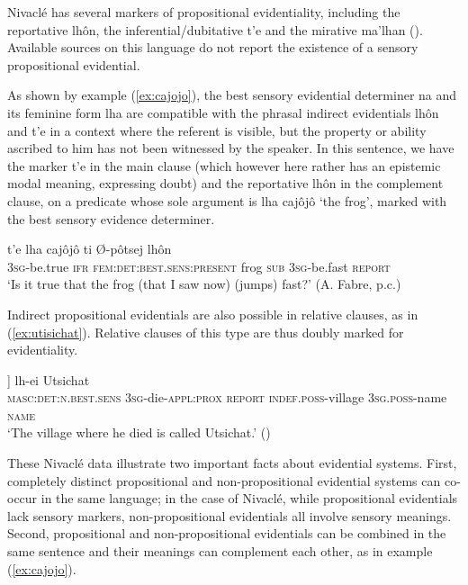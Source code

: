 \documentclass[oneside,a4paper,11pt]{article}
\newcommand{\ipa}[1]{{\phon \mbox{#1}}} %
\begin{document}
 Nivaclé has several markers of propositional evidentiality, including the reportative \ipa{lhôn}, the inferential/dubitative \ipa{t'e}  and the mirative \ipa{ma'lhan} (\citealt[256-257]{fabre14nivacle}). Available sources on this language do not report the existence of a sensory propositional evidential.

As shown by example (\ref{ex:cajojo}), the best sensory evidential determiner \ipa{na} and its feminine form \ipa{lha} are compatible with the phrasal indirect evidentials \ipa{lhôn} and \ipa{t'e} in a context where the referent is visible, but the property or ability ascribed to him has not been witnessed by the speaker. In this sentence, we have the marker \ipa{t'e} in the main clause (which however here rather has an epistemic modal meaning, expressing doubt) and the reportative \ipa{lhôn} in the complement clause, on a predicate whose sole argument is \ipa{lha} \ipa{cajôjô} `the frog', marked with the best sensory evidence determiner.

\begin{exe}
\ex \label{ex:cajojo}
\gll \ipa{y-ijô’} \ipa{t’e} \ipa{lha} \ipa{cajôjô} \ipa{ti} \ipa{Ø-pôtsej} \ipa{lhôn} \\
\textsc{3sg}-be.true \textsc{ifr} \textsc{fem:det:best.sens:present} frog \textsc{sub} \textsc{3sg}-be.fast \textsc{report} \\
\glt `Is it true that the frog (that I saw now) (jumps) fast?' (A. Fabre, p.c.)
\end{exe}

Indirect propositional evidentials are also possible in relative clauses, as in (\ref{ex:utisichat}).  Relative clauses of this type are thus doubly marked for evidentiality.

\begin{exe}
\ex \label{ex:utisichat}
\gll
[\ipa{pa} 	[\ipa{Ø-vaf-’e} 	\ipa{lhôn}] 	\ipa{yi-tsaat}] 	\ipa{lh-ei} 	\ipa{Utsichat} \\
\textsc{masc:det:n.best.sens} \textsc{3sg}-die-\textsc{appl:prox} \textsc{report} \textsc{indef.poss}-village \textsc{3sg.poss}-name \textsc{name} \\
\glt `The village where he died is called Utsichat.' (\citealt[157]{fabre14nivacle})
\end{exe}

These Nivaclé data illustrate two important facts about evidential systems. First, completely distinct propositional and non-propositional evidential systems can co-occur in the same language; in the case of Nivaclé, while propositional evidentials lack sensory markers, non-propositional evidentials all involve sensory meanings. Second, propositional and non-propositional evidentials can be combined in the same sentence and their meanings can complement each other, as in example (\ref{ex:cajojo}).
 
\end{document}
